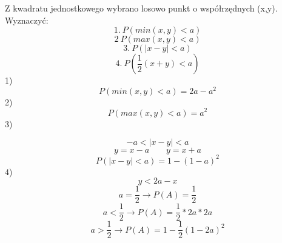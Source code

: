\medskip
{} 
\medskip
Z kwadratu jednostkowego wybrano losowo punkt o współrzędnych (x,y). Wyznaczyć:
$$
1. \ P(min(x,y) <a)
$$
$$
2 \ P(max(x,y) < a)
$$
$$
3. \ P(|x-y| < a)
$$
$$
4. \ P(\frac{1}{2}(x+y) < a)
$$
1)
$$
P(min(x,y) <a) =  2a-a^2
$$
2)
$$
P(max(x,y) < a) = a^2
$$
3)

$$
-a<|x-y|<a
$$
$$
y = x-a  \  \  \  \  \  \  \  \  \ y = x+ a
$$
$$
 P(|x-y| < a)  = 1 - (1-a)^2
$$
4)
$$
y < 2a -x
$$
$$
a = \frac{1}{2} \longrightarrow P(A) = \frac{1}{2}
$$
$$
a < \frac{1}{2} \longrightarrow P(A) = \frac{1}{2} * 2a *2a
$$
$$
a > \frac{1}{2} \longrightarrow P(A) = 1 - \frac{1}{2} (1-2a)^2
$$
